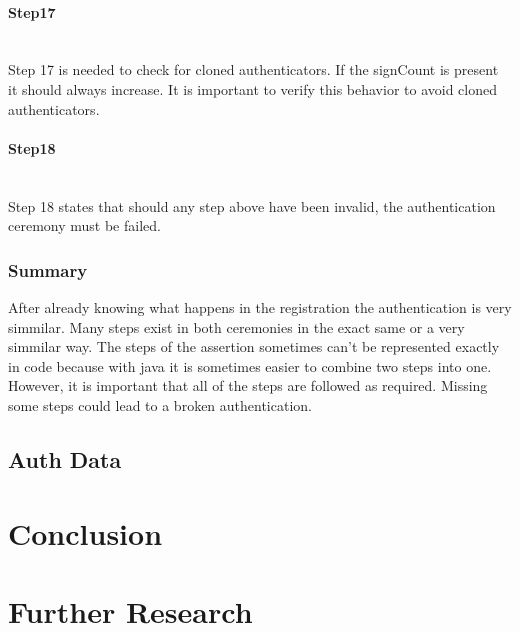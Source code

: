 \documentclass[a4paper, 11pt]{scrartcl}
\begin{document}
\paragraph{Step17}\hfill \\ 
Step 17 is needed to check for cloned authenticators. If the signCount is present it should always increase. It is important to verify this behavior to avoid cloned authenticators.

\paragraph{Step18}\hfill \\ 
Step 18 states that should any step above have been invalid, the authentication ceremony must be failed.

\subsubsection{Summary}
After already knowing what happens in the registration the authentication is very simmilar. Many steps exist in both ceremonies in the exact same or a very simmilar way. The steps of the assertion sometimes can't be represented exactly in code because with java it is sometimes easier to combine two steps into one. However, it is important that all of the steps are followed as required. Missing some steps could lead to a broken authentication.

\subsection{Auth Data}
\label{sec:authData}


\section{Conclusion}

\section{Further Research}

\clearpage

\printglossaries

\clearpage

\printbibliography[heading=bibintoc]
\end{document}
